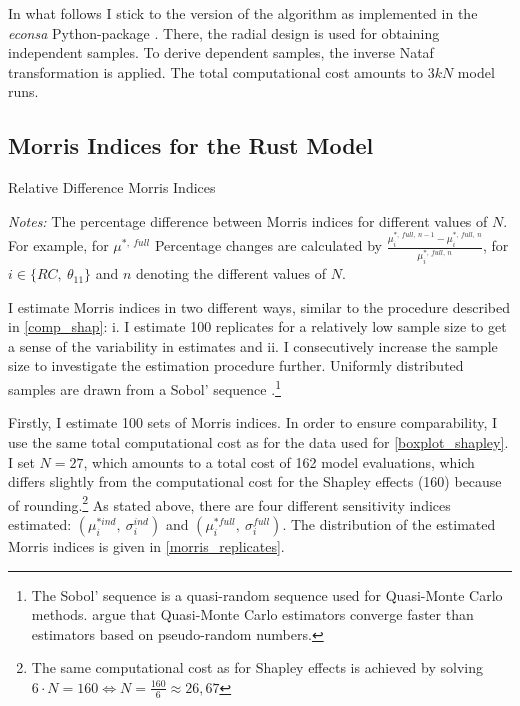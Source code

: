In what follows I stick to the version of the algorithm as implemented in the \textit{econsa} Python-package \citep{OSE21}. There, the radial design is used for obtaining independent samples. To derive dependent samples, the inverse Nataf transformation is applied. The total computational cost amounts to $3kN$ model runs.

\subsection{Morris Indices for the Rust Model} \label{morris_rust_model}

\begin{table}[t]
    \caption{Relative Difference Morris Indices}
    \label{rel_diff_morris}
    \centering

    \begin{threeparttable}
        \begin{centering}
            
            \begin{tablenotes}
                \small
                \item \textit{Notes:} The percentage difference between Morris indices for different values of $N$. For example, for $\mu^{\ast,\ full}$ Percentage changes are calculated by $\frac{\mu^{\ast,\ full,\ n-1}_i - \mu^{\ast,\ full,\ n}_i}{\mu^{\ast,\ full,\ n}_i}$, for $i \in \{RC,\ \theta_{11}\}$ and $n$ denoting the different values of $N$.
            \end{tablenotes}
        \end{centering}

        \end{threeparttable}
\end{table}

I estimate Morris indices in two different ways, similar to the procedure described in \cref{comp_shap}: i. I estimate 100 replicates for a relatively low sample size to get a sense of the variability in estimates and ii. I consecutively increase the sample size to investigate
the estimation procedure further. Uniformly distributed samples are drawn from a Sobol'
sequence \citep{S76}.\footnote{The Sobol' sequence is a quasi-random sequence used for Quasi-Monte Carlo methods. \citet{KTA12} argue that Quasi-Monte Carlo estimators converge faster than estimators based on pseudo-random numbers.}

Firstly, I estimate 100 sets of Morris indices. In order to ensure comparability, I use the same total computational cost as for the data used for \cref{boxplot_shapley}. I set $N = 27$, which amounts
to a total cost of 162 model evaluations, which differs slightly from the computational
cost for the Shapley effects (160) because of rounding.\footnote{The same computational cost as for Shapley effects is achieved by solving $6 \cdot N = 160 \Leftrightarrow N = \frac{160}{6} \approx 26,67$} As stated above, there are four different
sensitivity indices estimated: $(\mu^{\ast ind}_i,\ \sigma_i^{ind})$ and $(\mu^{\ast full}_i,\ \sigma_i^{full})$. The distribution of the
estimated Morris indices is given in \cref{morris_replicates}.


